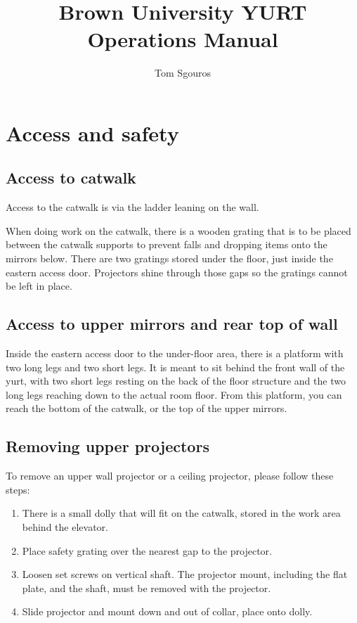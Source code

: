 \documentclass[11pt]{article}
\begin{document}
\title{Brown University YURT Operations Manual}
\author{Tom Sgouros}
\maketitle

\tableofcontents

\setlength{\parskip}{10pt}
\setlength{\parindent}{0pt}

\section{Access and safety}

\subsection{Access to catwalk}

Access to the catwalk is via the ladder leaning on the wall.

When doing work on the catwalk, there is a wooden grating that is to
be placed between the catwalk supports to prevent falls and dropping
items onto the mirrors below.  There are two gratings stored under the
floor, just inside the eastern access door.  Projectors shine through
those gaps so the gratings cannot be left in place.

\subsection{Access to upper mirrors and rear top of wall}

Inside the eastern access door to the under-floor area, there is a
platform with two long legs and two short legs. It is meant to sit
behind the front wall of the yurt, with two short legs resting on the
back of the floor structure and the two long legs reaching down to the
actual room floor.  From this platform, you can reach the bottom of
the catwalk, or the top of the upper mirrors.

\subsection{Removing upper projectors}

To remove an upper wall projector or a ceiling projector, please
follow these steps:

\begin{enumerate}
\item There is a small dolly that will fit on the catwalk, stored in
  the work area behind the elevator.

\item Place safety grating over the nearest gap to the projector.

\item Loosen set screws on vertical shaft.  The projector mount,
  including the flat plate, and the shaft, must be removed with the
  projector.

\item Slide projector and mount down and out of collar, place onto
  dolly.
\end{enumerate}
\end{document}
